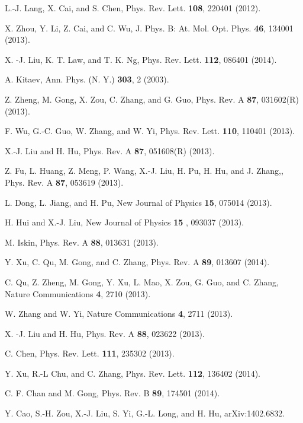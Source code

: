 \documentclass[prl,aps,twocolumn,showpacs, floatfix]{revtex4}
\begin{document}
\begin{thebibliography}{99}
 {L.-J. Lang, X. Cai, and S. Chen, Phys. Rev. Lett.
\textbf{108}, 220401 (2012).}

 {X. Zhou, Y. Li, Z. Cai, and C. Wu, J. Phys. B: At. Mol.
Opt. Phys. \textbf{46}, 134001 (2013).}

 {X. -J. Liu, K. T. Law, and T. K. Ng, Phys. Rev.
Lett. \textbf{112}, 086401 (2014).}

 {A. Kitaev, Ann. Phys. (N. Y.) \textbf{303}, 2 (2003).}

 {Z. Zheng, M. Gong, X. Zou, C. Zhang, and G. Guo,
Phys. Rev. A \textbf{87}, 031602(R) (2013).}

 {F. Wu, G.-C. Guo, W. Zhang, and W. Yi, Phys. Rev.
Lett. \textbf{110}, 110401 (2013). }

 {X.-J. Liu and H. Hu, Phys. Rev. A \textbf{87},
051608(R) (2013). }

 {Z. Fu, L. Huang, Z. Meng, P. Wang, X.-J. Liu, H. Pu, H.
Hu, and J. Zhang,, Phys. Rev. A \textbf{87}, 053619 (2013).}

 {L. Dong, L. Jiang, and H. Pu, New Journal of Physics
\textbf{15}, 075014 (2013).}

 {H. Hui and X.-J. Liu, New Journal of Physics \textbf{15%
}, 093037 (2013). }

 {M. Iskin, Phys. Rev. A \textbf{88}, 013631 (2013). }

 {Y. Xu, C. Qu, M. Gong, and C. Zhang, Phys. Rev. A
\textbf{89}, 013607 (2014).}

 {C. Qu, Z. Zheng, M. Gong, Y. Xu, L. Mao, X. Zou, G. Guo,
and C. Zhang, Nature Communications \textbf{4}, 2710 (2013).}

 {W. Zhang and W. Yi, Nature Communications \textbf{4},
2711 (2013).}

 {X. -J. Liu and H. Hu, Phys. Rev. A \textbf{88}, 023622
(2013).}

 {C. Chen, Phys. Rev. Lett. \textbf{111}, 235302 (2013).%
}

 {Y. Xu, R.-L Chu, and C. Zhang, Phys. Rev. Lett.
\textbf{112}, 136402 (2014).}

 {C. F. Chan and M. Gong, Phys. Rev. B \textbf{89},
174501 (2014).}

 {Y. Cao, S.-H. Zou, X.-J. Liu, S. Yi, G.-L. Long,
and H. Hu, arXiv:1402.6832.}


\end{thebibliography}
\end{document}
